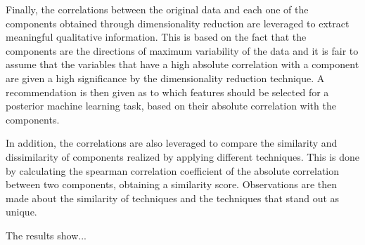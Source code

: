 Finally, the correlations between the original data and each one of the components obtained through dimensionality reduction  are leveraged to extract meaningful qualitative information. This is based on the fact that the components are the directions of maximum variability of the data and it is fair to assume that the variables that have a high absolute correlation with a component are given a high significance by the dimensionality reduction technique.
A recommendation is then given as to which features should be selected for a posterior machine learning task, based on their absolute correlation with the components.

In addition, the correlations are also leveraged to compare the similarity and dissimilarity of components realized by applying different techniques. This is done by calculating the spearman correlation coefficient of the absolute correlation between two components, obtaining a similarity score. Observations are then made about the similarity of techniques and the techniques that stand out as unique.

The results show... %







